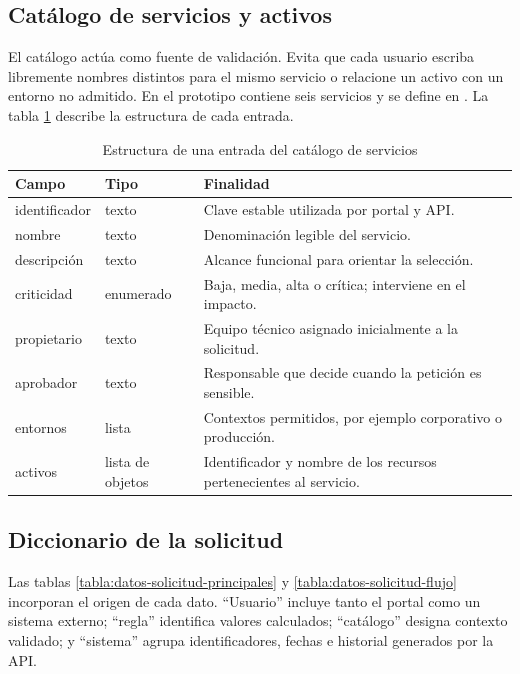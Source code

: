 \subsection{Catálogo de servicios y activos}

El catálogo actúa como fuente de validación. Evita que cada usuario escriba libremente nombres distintos para el mismo servicio o relacione un activo con un entorno no admitido. En el prototipo contiene seis servicios y se define en . La tabla \ref{tabla:estructura-catalogo} describe la estructura de cada entrada.

\begin{table}[H]
\centering
\small
\begin{tabularx}{\textwidth}{l l X}
\textbf{Campo} & \textbf{Tipo} & \textbf{Finalidad} \\
\hline
identificador & texto & Clave estable utilizada por portal y API. \\
nombre & texto & Denominación legible del servicio. \\
descripción & texto & Alcance funcional para orientar la selección. \\
criticidad & enumerado & Baja, media, alta o crítica; interviene en el impacto. \\
propietario & texto & Equipo técnico asignado inicialmente a la solicitud. \\
aprobador & texto & Responsable que decide cuando la petición es sensible. \\
entornos & lista & Contextos permitidos, por ejemplo corporativo o producción. \\
activos & lista de objetos & Identificador y nombre de los recursos pertenecientes al servicio. \\
\end{tabularx}
\caption{Estructura de una entrada del catálogo de servicios}
\label{tabla:estructura-catalogo}
\end{table}

\subsection{Diccionario de la solicitud}

Las tablas \ref{tabla:datos-solicitud-principales} y \ref{tabla:datos-solicitud-flujo} incorporan el origen de cada dato. ``Usuario'' incluye tanto el portal como un sistema externo; ``regla'' identifica valores calculados; ``catálogo'' designa contexto validado; y ``sistema'' agrupa identificadores, fechas e historial generados por la API.

